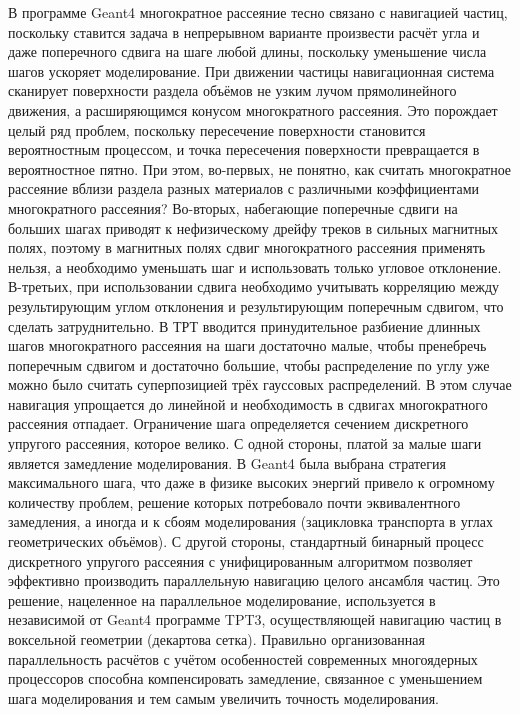 \documentclass[a4paper,12pt]{article}
\begin{document}
\begin{large}
  В программе Geant4  многократное рассеяние тесно связано с навигацией частиц, поскольку ставится задача в непрерывном варианте произвести расчёт угла и даже поперечного сдвига на шаге любой длины, поскольку уменьшение числа шагов ускоряет моделирование.
  При движении частицы навигационная система сканирует поверхности раздела объёмов не узким лучом прямолинейного движения, а расширяющимся конусом многократного рассеяния.
  Это порождает целый ряд проблем, поскольку пересечение поверхности становится вероятностным процессом, и точка пересечения поверхности превращается в вероятностное пятно.
  При этом, во-первых, не понятно, как считать многократное рассеяние вблизи раздела разных материалов с различными коэффициентами многократного рассеяния?
  Во-вторых, набегающие поперечные сдвиги на больших шагах приводят к нефизическому дрейфу треков в сильных магнитных полях, поэтому в магнитных полях сдвиг многократного рассеяния применять нельзя, а необходимо уменьшать шаг и использовать только угловое отклонение.
  В-третьих, при использовании сдвига необходимо учитывать корреляцию между результирующим углом отклонения и результирующим поперечным сдвигом, что сделать затруднительно.
  В ТРТ вводится принудительное разбиение длинных шагов многократного рассеяния на шаги достаточно малые, чтобы пренебречь поперечным сдвигом и достаточно большие, чтобы распределение по углу уже можно было считать суперпозицией трёх гауссовых распределений.
  В этом случае навигация упрощается до линейной и необходимость в сдвигах многократного рассеяния отпадает.
  Ограничение шага определяется сечением дискретного упругого рассеяния, которое велико.
  С одной стороны, платой за малые шаги является замедление моделирования.
  В Geant4 была выбрана стратегия максимального шага, что даже в физике высоких энергий привело к огромному количеству проблем, решение которых потребовало почти эквивалентного замедления, а иногда и к сбоям моделирования (зацикловка транспорта в углах геометрических объёмов).
  С другой стороны, стандартный бинарный процесс дискретного упругого рассеяния с унифицированным алгоритмом позволяет эффективно производить параллельную навигацию целого ансамбля частиц.
  Это решение, нацеленное на параллельное моделирование, используется в независимой от Geant4 программе TPT3, осуществляющей навигацию частиц в воксельной геометрии (декартова сетка).
  Правильно организованная параллельность расчётов с учётом особенностей современных многоядерных процессоров способна компенсировать замедление, связанное с уменьшением шага моделирования и тем самым увеличить точность моделирования.


\end{large}
\end{document}
